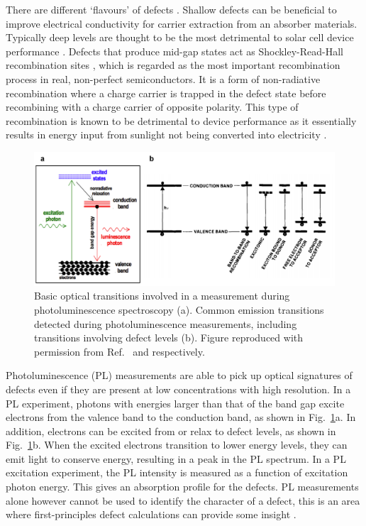 \documentclass[11pt, twoside]{report}
\begin{document}
There are different `flavours' of defects \cite{Aron_defect_tolerance}. Shallow defects can be beneficial to improve electrical conductivity for carrier extraction from an absorber materials. Typically deep levels are thought to be the most detrimental to solar cell device performance \cite{Stoneham_killer_defects}. 
Defects that produce mid-gap states act as Shockley-Read-Hall recombination sites \cite{SRH}, which is regarded as the most important recombination process in real, non-perfect semiconductors. It is a form of non-radiative recombination where a charge carrier is trapped in the defect state before recombining with a charge carrier of opposite polarity. This type of recombination is known to be detrimental to device performance as it essentially results in energy input from sunlight not being converted into electricity \cite{Nelson4}.

\begin{figure}[h!]
  \centering
    \includegraphics[width=1.0\textwidth]{figures/PL_transitions.png}
    \caption[Basic optical transitions involved in a measurement during photoluminescence spectroscopy (a). Common emission transitions detected during photoluminescence measurements, including transitions involving defect levels (b).]{Basic optical transitions involved in a measurement during photoluminescence spectroscopy (a). Common emission transitions detected during photoluminescence measurements, including transitions involving defect levels (b). Figure reproduced with permission from Ref.~ and  respectively.}
  \label{PL_transitions}
\end{figure}

Photoluminescence (PL) measurements are able to pick up optical signatures of defects even if they are present at low concentrations with high resolution. 
In a PL experiment, photons with energies larger than that of the band gap excite electrons from the valence band to the conduction band, as shown in Fig.~\ref{PL_transitions}a. In addition, electrons can be excited from or relax to defect levels, as shown in Fig.~\ref{PL_transitions}b. When the excited electrons transition to lower energy levels, they can emit light to conserve energy, resulting in a peak in the PL spectrum. In a PL excitation experiment, the PL intensity is measured as a function of excitation photon energy. This gives an absorption profile for the defects.
PL measurements alone however cannot be used to identify the character of a defect, this is an area where first-principles defect calculations can provide some insight \cite{defects_tutorial}.
\end{document}
